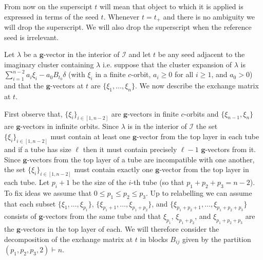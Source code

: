 \documentclass{amsart}
\numberwithin{theorem}{section}
\newcommand{\bfg}{{\boldsymbol{g}}}
\newcommand{\cI}{\mathcal{I}}
\begin{document}
  From now on the superscipt $t$ will mean that object to which it is applied is expressed in terms of the seed $t$.
  Whenever $t=t_+$ and there is no ambiguity we will drop the superscript.
  We will also drop the superscript when the reference seed is irrelevant.

  Let $\lambda$ be a $\bfg$-vector in the interior of $\cI$ and let $t$ be any seed adjacent to the imaginary cluster containing $\lambda$ i.e. suppose that the cluster expansion of $\lambda$ is $\sum_{i=1}^{n-2} a_i \xi_i -a_0 B_{t_0} \delta$ (with $\xi_i$ in a finite $c$-orbit,  $a_i\geq 0$ for all $i\geq 1$, and $a_0>0$) and that the $\bfg$-vectors at $t$ are $\{\xi_1,\dots,\xi_n\}$.
  We now describe the exchange matrix at $t$.
  
  First observe that, $\{\xi_i\}_{i\in[1,n-2]}$ are $\bfg$-vectors in finite $c$-orbits and $\{\xi_{n-1},\xi_n\}$ are $\bfg$-vectors in infinite orbits.
  Since $\lambda$ is in the interior of $\cI$ the set $\{\xi_i\}_{i\in[1,n-2]}$ must contain at least one $\bfg$-vector from the top layer in each tube and if a tube has size $\ell$ then it must contain precisely $\ell-1$ $\bfg$-vectors from it. 
  Since $\bfg$-vectors from the top layer of a tube are incompatible with one another, the set $\{\xi_i\}_{i\in[1,n-2]}$ must contain exactly one $\bfg$-vector from the top layer in each tube.
  Let $p_i+1$ be the size of the $i$-th tube (so that $p_1+p_2+p_3 = n-2$).
  To fix ideas we assume that $0\leq p_1\leq p_2 \leq p_3$.
  Up to relabelling we can assume that each subset $\{\xi_1,\dots,\xi_{p_1}\}$, $\{\xi_{p_1+1},\dots,\xi_{p_1+p_2}\}$, and $\{\xi_{p_1+p_2+1},\dots,\xi_{p_1+p_2+p_3}\}$ consists of $\bfg$-vectors from the same tube and that $\xi_{p_1}$, $\xi_{p_1+p_2}$, and $\xi_{p_1+p_2+p_3}$ are the $\bfg$-vectors in the top layer of each. 
  We will therefore consider the decomposition of the exchange matrix at $t$ in blocks $B_{ij}$ given by the partition $(p_1,p_2,p_3,2)\vdash n$.
\end{document}
